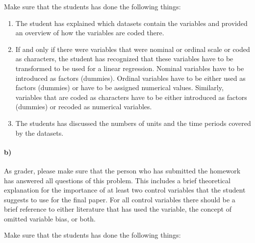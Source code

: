 \documentclass[12pt]{article}\usepackage[]{graphicx}\usepackage[]{color}
\begin{document}
Make sure that the students has done the following things:

\begin{enumerate}
	\item The student has explained which datasets contain the variables and provided an overview of how the variables are coded there.
	\item If and only if there were variables that were nominal or ordinal scale or coded as characters, the student has recognized that these variables have to be transformed to be used for a linear regression. Nominal variables have to be introduced as factors (dummies). Ordinal variables have to be either used as factors (dummies) or have to be assigned numerical values. Similarly, variables that are coded as characters have to be either introduced as factors (dummies) or recoded as numerical variables.
	\item The students has discussed the numbers of units and the time periods covered by the datasets.
\end{enumerate}

\paragraph*{b)} As grader, please make sure that the person who has submitted the homework has answered all questions of this problem. This includes a brief theoretical explanation for the importance of at least two control variables that the student suggests to use for the final paper. For all control variables there should be a brief reference to either literature that has used the variable, the concept of omitted variable bias, or both.

Make sure that the students has done the following things:
\end{document}
